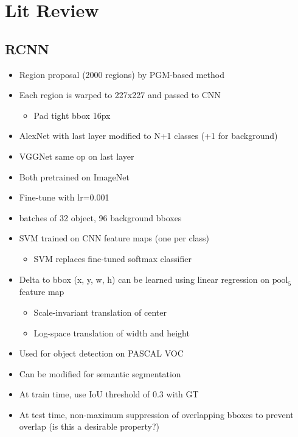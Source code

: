 \chapter{Lit Review}
\label{chapter:lit_review}

\section*{RCNN \cite{rcnn}}
\begin{itemize}
\item Region proposal (2000 regions) by PGM-based method 
\item Each region is warped to 227x227 and passed to CNN
	\begin{itemize}
	\item Pad tight bbox 16px
	\end{itemize}
\item AlexNet with last layer modified to N+1 classes (+1 for background)
\item VGGNet same op on last layer
\item Both pretrained on ImageNet
\item Fine-tune with lr=0.001
\item batches of 32 object, 96 background bboxes
\item SVM trained on CNN feature maps (one per class)
	\begin{itemize}
	\item SVM replaces fine-tuned softmax classifier
	\end{itemize}
	
\item Delta to bbox (x, y, w, h) can be learned using linear regression on $\text{pool}_5$ feature map
	\begin{itemize}
	\item Scale-invariant translation of center
	\item Log-space translation of width and height
	\end{itemize}
\item Used for object detection on PASCAL VOC
\item Can be modified for semantic segmentation
\item At train time, use IoU threshold of 0.3 with GT
\item At test time, non-maximum suppression of overlapping bboxes to prevent overlap (is this a desirable property?)
\end{itemize}



